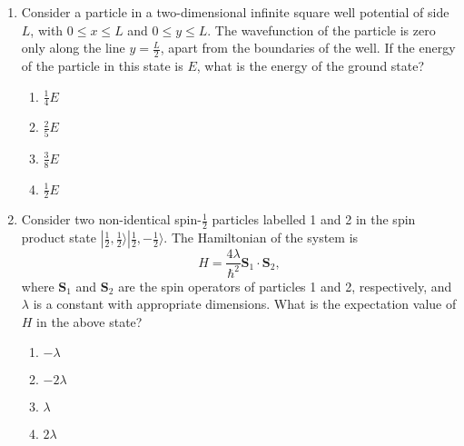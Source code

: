 \documentclass[journal]{IEEEtran}
\begin{document}
\begin{enumerate}
\begin{enumerate}
\begin{figure}[H]
	\centering
	
\end{figure} 
\item \begin{figure}[H]
	\centering
	
\end{figure} 
\end{enumerate}
\item Consider a particle in a two-dimensional infinite square well potential of side $L$, with $0 \leq x \leq L$ and $0 \leq y \leq L$. The wavefunction of the particle is zero only along the line $y = \frac{L}{2}$, apart from the boundaries of the well. If the energy of the particle in this state is $E$, what is the energy of the ground state?
\begin{enumerate}
\item $\frac{1}{4} E$
\item $\frac{2}{5} E$
\item $\frac{3}{8} E$
\item $\frac{1}{2} E$
\end{enumerate}
\item Consider two non-identical spin-$\frac{1}{2}$ particles labelled 1 and 2 in the spin product state $|\frac{1}{2}, \frac{1}{2}\rangle |\frac{1}{2}, -\frac{1}{2}\rangle$. The Hamiltonian of the system is 
\[
H = \frac{4\lambda}{\hbar^2} \mathbf{S}_1 \cdot \mathbf{S}_2,
\]
where $\mathbf{S}_1$ and $\mathbf{S}_2$ are the spin operators of particles 1 and 2, respectively, and $\lambda$ is a constant with appropriate dimensions. What is the expectation value of $H$ in the above state?
\begin{enumerate}
\item $-\lambda$
\item $-2\lambda$
\item $\lambda$
\item $2\lambda$
\end{enumerate}
\end{enumerate}
\end{document}
